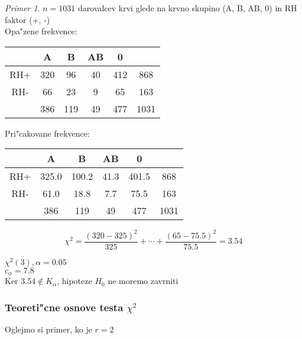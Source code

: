 \documentclass[a4paper,12pt]{article}
\theoremstyle{definition}
\theoremstyle{remark}
\newtheorem*{ex}{Primer}
\begin{document}
\begin{ex}
    $n=1031$ darovalcev krvi glede na krvno skupino (A, B, AB, 0) in RH faktor (+, -) \\
    Opa"zene frekvence:

    \begin{center}
        \begin{tabular}{c | c c c c | c} 
            & A & B & AB & 0 & \\
            \hline
            RH+ & 320 & 96 & 40 & 412 & 868 \\ 
            RH- & 66 & 23 & 9 & 65 & 163 \\
            \hline
            & 386 & 119 & 49 & 477 & 1031
        \end{tabular}
    \end{center}

    Pri"cakovane frekvence:

    \begin{center}
        \begin{tabular}{c | c c c c | c} 
            & A & B & AB & 0 & \\
            \hline
            RH+ & 325.0 & 100.2 & 41.3 & 401.5 & 868 \\ 
            RH- & 61.0 & 18.8 & 7.7 & 75.5 & 163 \\
            \hline
            & 386 & 119 & 49 & 477 & 1031
        \end{tabular}
    \end{center}

    \begin{equation*}
        \chi^2 = \frac{(320 - 325)^2}{325} + \cdots + \frac{(65 - 75.5)^2}{75.5} = 3.54
    \end{equation*}

    $\chi^2(3), \alpha = 0.05$ \\
    $c_{\alpha} = 7.8$ \\


    Ker $3.54 \notin K_{\alpha}$, hipoteze $H_0$ ne moremo zavrniti
\end{ex}




\subsubsection{Teoreti"cne osnove testa $\chi^2$}

Oglejmo si primer, ko je $r=2$
\end{document}
